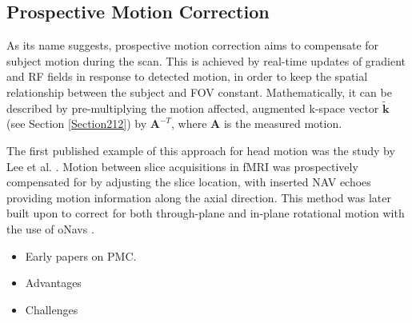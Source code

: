 \documentclass[class=article, crop=false]{standalone}
\begin{document}
\subsection{Prospective Motion Correction}
As its name suggests, prospective motion correction aims to compensate for subject motion during the scan. This is achieved by real-time updates of gradient and RF fields in response to detected motion, in order to keep the spatial relationship between the subject and FOV constant. Mathematically, it can be described by pre-multiplying the motion affected, augmented k-space vector $\tilde{\textbf{k}}$ (see Section \ref{Section212}) by $\textbf{A}^{-T}$, where \textbf{A} is the measured motion. 
\par
The first published example of this approach for head motion was the study by Lee et al. \parencite*{Lee1996}. Motion between slice acquisitions in fMRI was prospectively compensated for by adjusting the slice location, with inserted NAV echoes providing motion information along the axial direction. This method was later built upon to correct for both through-plane and in-plane rotational motion with the use of oNavs \parencite{Lee1998}.


\begin{itemize}
	\item Early papers on PMC.
	\item Advantages
	\item Challenges
\end{itemize}
\end{document}

